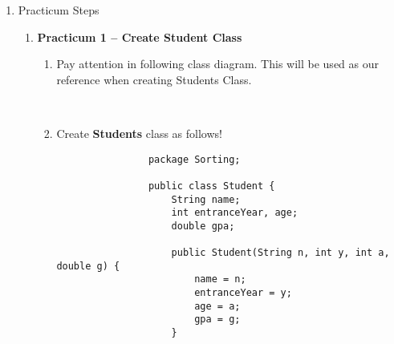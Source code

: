 \documentclass[12pt,titlepage]{article}
\begin{document}
\begin{enumerate}
    \item Practicum Steps
    \begin{enumerate}[label=\textbf{\alph*.}]
        \item \textbf{Practicum 1 – Create Student Class}
        \begin{enumerate}[label=\arabic*.]
            \item Pay attention in following class diagram. This will be used as our reference when creating Students Class.
            \mbox{}\\
            \mbox{}\\
            \item Create \textbf{Students} class as follows!
            \begin{verbatim}
                package Sorting;

                public class Student {
                    String name;
                    int entranceYear, age;
                    double gpa;

                    public Student(String n, int y, int a, double g) {
                        name = n;
                        entranceYear = y;
                        age = a;
                        gpa = g;
                    }


\end{verbatim}
\end{enumerate}
\end{enumerate}
\end{enumerate}
\end{document}
